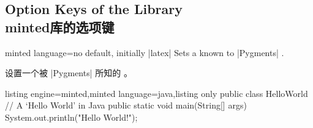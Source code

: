 \subsection{Option Keys of the  Library\\minted库的选项键}

\begin{docTcbKey}{minted language}{=}{no default, initially |latex|}
Sets a  known to |Pygments| .

设置一个被 |Pygments|  所知的 。


\begin{dispExample}
\begin{tcblisting}{listing engine=minted,minted language=java,listing only}
public class HelloWorld {
    // A `Hello World' in Java
    public static void main(String[] args) {
        System.out.println("Hello World!");
    }
}
\end{tcblisting}
\end{dispExample}
\end{docTcbKey}



